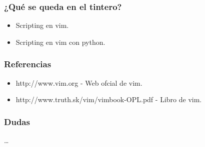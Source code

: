 \documentclass[10pt]{beamer}
\begin{document}
  \begin{frame}
    \frametitle{¿Qué se queda en el tintero?}
    \begin{itemize}
      \item Scripting en vim.
      \item Scripting en vim con python.
    \end{itemize}
  \end{frame}

  \begin{frame}
    \frametitle{Referencias}
    \begin{itemize}
      \item \small{http://www.vim.org - Web ofcial de vim.}
      \item \small{http://www.truth.sk/vim/vimbook-OPL.pdf - Libro de vim.}
    \end{itemize}
  \end{frame}

  \begin{frame}
    \frametitle{Dudas}
    \dots
  \end{frame}
\end{document}
